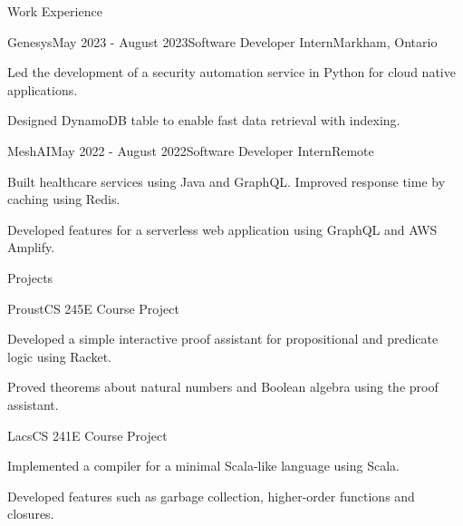 \documentclass[
	12pt, %
]{resume} %
\begin{document}
\begin{rSection}{Work Experience}

	\begin{rSubsection}{Genesys}{May 2023 - August 2023}{Software Developer Intern}{Markham, Ontario}
		\item Led the development of a security automation service in Python for cloud native applications.
		\item Designed DynamoDB table to enable fast data retrieval with indexing.
	\end{rSubsection}


	\begin{rSubsection}{MeshAI}{May 2022 - August 2022}{Software Developer Intern}{Remote}
		\item Built healthcare services using Java and GraphQL. Improved response time by caching using Redis.
		\item Developed features for a serverless web application using GraphQL and AWS Amplify.
	\end{rSubsection}



\end{rSection}

\begin{rSection}{Projects}
     \begin{rSubsection}{Proust}{CS 245E Course Project}{}{}
        \item Developed a simple interactive proof assistant for propositional and predicate logic using Racket.
        \item Proved theorems about natural numbers and Boolean algebra using the proof assistant.
     \end{rSubsection}
     \begin{rSubsection}{Lacs}{CS 241E Course Project}{}{}
		\item Implemented a compiler for a minimal Scala-like language using Scala.
        \item Developed features such as garbage collection, higher-order functions and closures.
	\end{rSubsection}
\end{rSection}
\end{document}
